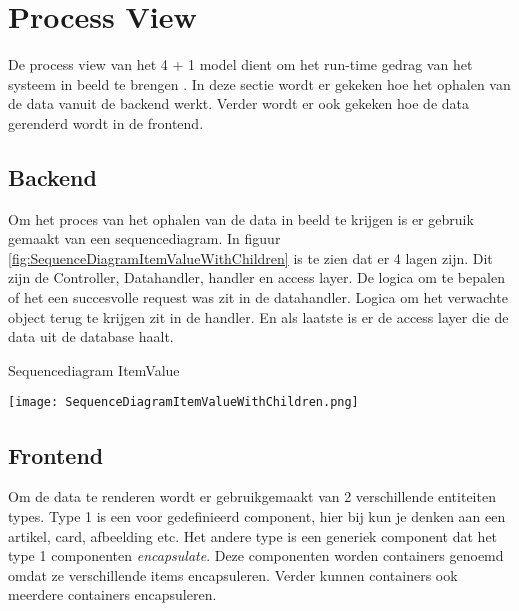 \section{Process View}
De process view van het 4 + 1 model dient om het run-time gedrag van het systeem in beeld te brengen \parencite{4+1ViewModelPaper}.
In deze sectie wordt er gekeken hoe het ophalen van de data vanuit de backend werkt.
Verder wordt er ook gekeken hoe de data gerenderd wordt in de frontend.

\subsection{Backend}
Om het proces van het ophalen van de data in beeld te krijgen is er gebruik gemaakt van een sequencediagram.
In figuur \ref{fig:SequenceDiagramItemValueWithChildren} is te zien dat er 4 lagen zijn. 
Dit zijn de Controller, Datahandler, handler en access layer.
De logica om te bepalen of het een succesvolle request was zit in de datahandler.
Logica om het verwachte object terug te krijgen zit in de handler.
En als laatste is er de access layer die de data uit de database haalt.

\whitespace
\begin{graphic}
    \captionsetup{type=figure}
    \caption{Sequencediagram ItemValue}
    \texttt{[image: SequenceDiagramItemValueWithChildren.png]}
    \label{fig:SequenceDiagramItemValueWithChildren}
\end{graphic}

%

\newpage
\subsection{Frontend}

Om de data te renderen wordt er gebruikgemaakt van 2 verschillende entiteiten types.
Type 1 is een voor gedefinieerd component, hier bij kun je denken aan een artikel, card, afbeelding etc.
Het andere type is een generiek component dat het type 1 componenten \textit{encapsulate}.
Deze componenten worden containers genoemd omdat ze verschillende items encapsuleren.
Verder kunnen containers ook meerdere containers encapsuleren.

